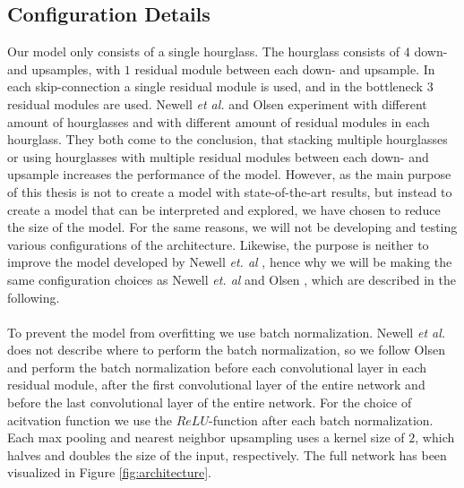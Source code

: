 \documentclass[./main.tex]{subfiles}
\begin{document}
\subsection{Configuration Details}\label{subsec:conf_details}
Our model only consists of a single hourglass. The hourglass consists of $4$ down- and upsamples, with $1$ residual module between each down- and upsample. In each skip-connection a single residual module is used, and in the bottleneck $3$ residual modules are used. Newell \textit{et al.} \cite{Newell} and Olsen \cite{Camilla} experiment with different amount of hourglasses and with different amount of residual modules in each hourglass. They both come to the conclusion, that stacking multiple hourglasses or using hourglasses with multiple residual modules between each down- and upsample increases the performance of the model. However, as the main purpose of this thesis is not to create a model with state-of-the-art results, but instead to create a model that can be interpreted and explored, we have chosen to reduce the size of the model. For the same reasons, we will not be developing and testing various configurations of the architecture. Likewise, the purpose is neither to improve the model developed by Newell \textit{et. al} \cite{Newell}, hence why we will be making the same configuration choices as Newell \textit{et. al} \cite{Newell} and Olsen \cite{Camilla}, which are described in the following.
\\
\\
To prevent the model from overfitting we use batch normalization. Newell \textit{et al.} does not describe where to perform the batch normalization, so we follow Olsen \cite{Camilla} and perform the batch normalization before each convolutional layer in each residual module, after the first convolutional layer of the entire network and before the last convolutional layer of the entire network. For the choice of acitvation function we use the $ReLU$-function after each batch normalization. Each max pooling and nearest neighbor upsampling uses a kernel size of $2$, which halves and doubles the size of the input, respectively. The full network has been visualized in Figure \ref{fig:architecture}.
\\
\end{document}
